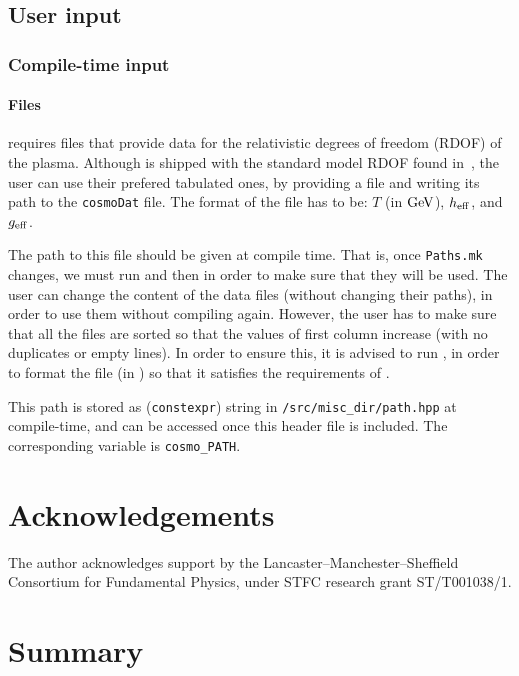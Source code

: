 \documentclass[11pt,a4paper]{article}
\begin{document}
\subsection{User input}\label{sec:input}
%
\subsubsection{Compile-time input}\label{sec:compile_time_input} 
%
\paragraph{Files} \nsc requires files that provide data for the relativistic degrees of freedom (RDOF) of the plasma. Although \nsc is shipped with the standard model RDOF found in~\cite{Saikawa:2020swg}, the user can use their prefered tabulated ones, by providing a file and writing its path to the {\tt cosmoDat} file. The format of the file has to be: $T$ (in ${\rm GeV}$), $h_{\rm eff}{}$, and $g_{\rm eff}{}$.

The path to this file should be given at compile time. That is, once {\tt Paths.mk} changes, we must run  and then  in order to make sure that they will be used. The user can change the content of the data files (without changing their paths), in order to use them without compiling \nsc again. However, the user has to make sure that all the files are sorted so that the values of first column increase (with no duplicates or empty lines). In order to ensure this, it is advised to run , in order to format the file (in ) so that it satisfies the requirements of \nsc.

This path is stored as ({\tt constexpr}) string in {\tt \nsc/src/misc\_dir/path.hpp} at compile-time, and can be accessed once this header file is included. The corresponding variable is {\tt cosmo\_PATH}.








\section{Acknowledgements}
%
The author acknowledges support by the Lancaster–Manchester–Sheffield Consortium for Fundamental Physics, under STFC research grant ST/T001038/1.


\section{Summary}
\end{document}

